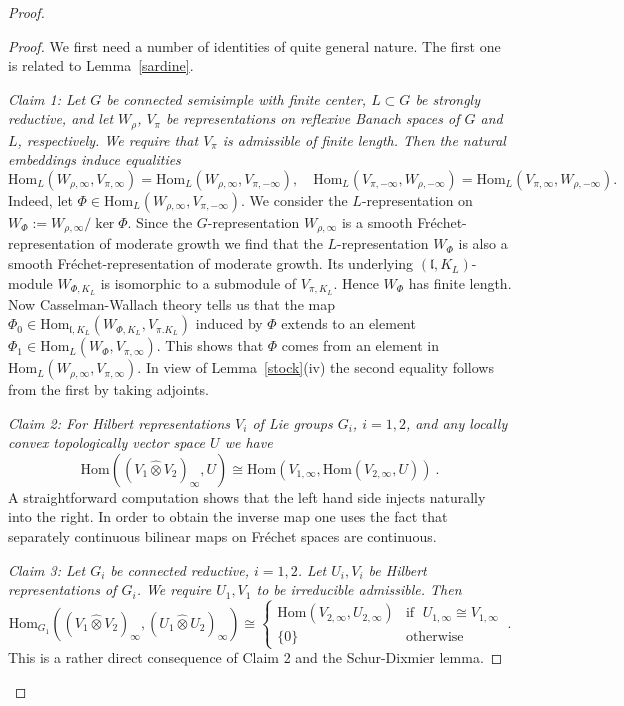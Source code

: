 \documentclass[10]{amsart}
\theoremstyle{remark}
\theoremstyle{definition}
\numberwithin{equation}{section}
\newcommand{\Hom}{\mathrm{Hom}}
\newcommand{\fl}{{\mathfrak l}}
\begin{document}
{\begin{proof}
\begin{proof} We first need a number of identities of quite general nature. The first one is related to Lemma~\ref{sardine}.

{\it Claim 1: Let $G$ be connected semisimple with finite center,  $L\subset G$ be strongly reductive, and let $W_\rho$, $V_\pi$  be  representations on reflexive Banach spaces 
of $G$ and $L$, respectively. We require that $V_\pi$ is admissible of finite length.
Then the natural embeddings induce equalities 
$$\Hom_L(W_{\rho,\infty},V_{\pi,\infty})=\Hom_L(W_{\rho,\infty},V_{\pi,-\infty}),\quad \Hom_L(V_{\pi,-\infty}, W_{\rho,-\infty})=\Hom_L(V_{\pi,\infty}, W_{\rho,-\infty}).$$}
Indeed, let $\Phi\in \Hom_L(W_{\rho,\infty},V_{\pi,-\infty})$. We consider the $L$-representation on $W_\Phi:=W_{\rho,\infty}/\ker\Phi$. Since the $G$-representation $W_{\rho,\infty}$ is a smooth
Fr\' echet-representation of moderate growth we find that the $L$-representation $W_\Phi$ is also a smooth Fr\' echet-representation of moderate growth. Its underlying $(\fl,K_L)$-module $W_{\Phi, K_L}$ is isomorphic to a 
submodule of $V_{\pi,K_L}$. Hence $W_\Phi$ has finite length. Now Casselman-Wallach theory tells us that the map $\Phi_0\in\Hom_{\fl,K_L}(W_{\Phi, K_L}, V_{\pi.K_L})$ induced by $\Phi$ extends to
an element $\Phi_1\in \Hom_L(W_{\Phi},V_{\pi,\infty})$. This shows that $\Phi$ comes from an element in $\Hom_L(W_{\rho,\infty},V_{\pi,\infty})$. In view of Lemma~\ref{stock}(iv) the second equality follows from the first by taking adjoints.

{\it Claim 2: For Hilbert representations $V_i$ of Lie groups $G_i$, $i=1,2$, and any locally convex topologically vector space $U$ we have
$$   \Hom((V_1\hat\otimes V_2)_\infty, U)\cong \Hom(V_{1,\infty},\Hom(V_{2,\infty},U))\ .$$}
A straightforward computation shows that the left hand side injects naturally into the right. In order to obtain the inverse map one uses the fact
that separately continuous bilinear maps on Fr\' echet spaces are continuous. 





{\it Claim 3: Let $G_i$ be connected reductive, $i=1,2$. Let $U_i,V_i$ be Hilbert representations of $G_i$. We require $U_1,V_1$ to be irreducible admissible. Then
$$ \Hom_{G_1}((V_1\hat\otimes V_2)_\infty,(U_1\hat\otimes U_2)_\infty)\cong
\left\{\begin{array}{cc} 
\Hom(V_{2,\infty}, U_{2,\infty})&\mbox{if }\;U_{1,\infty}\cong V_{1,\infty}\\
\{0\}&\mbox{otherwise}
\end{array}\right. \ . 
$$ }
This is a rather direct consequence of Claim 2 and the Schur-Dixmier lemma.


\end{proof}
\end{proof}}
\end{document}
